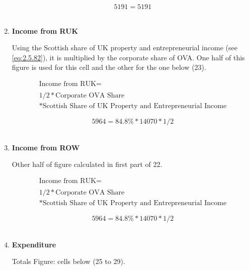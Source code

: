\begin{enumerate}
\begin{equation} \nonumber
5191 = 5191
\end{equation}\\


\item \textbf {Income from RUK}

Using the Scottish share of UK property and entrepreneurial income (see \ref{eq:2.5.82}), it is multiplied by the corporate share of OVA. One half of this figure is used for this cell and the other for the one below (23). \cite{ONS2011c}

\begin{equation}
\begin{split}
\text{Income from RUK} =  \\ \\
1/2*\text{Corporate OVA Share}\\
*\text{Scottish Share of UK Property and Entrepreneurial Income}
\end{split} \label{eq:2.5.26}
\end{equation}

\begin{equation} \nonumber
5964 = 84.8\%*14070*1/2
\end{equation}\\


\item \textbf {Income from ROW}

Other half of figure calculated in first part of 22.

\begin{equation}
\begin{split}
\text{Income from RUK} =  \\ \\
1/2*\text{Corporate OVA Share}\\
*\text{Scottish Share of UK Property and Entrepreneurial Income}
\end{split} \label{eq:2.5.27}
\end{equation}

\begin{equation} \nonumber
5964 = 84.8\%*14070*1/2
\end{equation}\\


\pagebreak

\item \textbf {Expenditure}

Totals Figure: cells below (25 to 29).


\end{enumerate}
